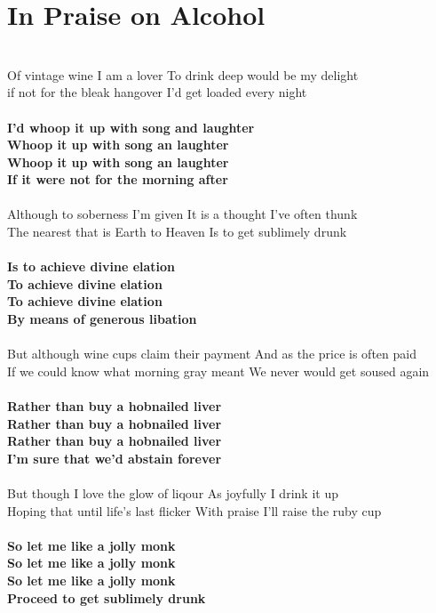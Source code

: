 \documentclass[letterpaper,9pt]{article}
\begin{document}
\section{In Praise on Alcohol}
\Large
\noindent
\\Of vintage wine I am a lover To drink deep would be my delight
\\if not for the bleak hangover I'd get loaded every night
\\
\\\textbf{I'd whoop it up with song and laughter
\\Whoop it up with song an laughter
\\Whoop it up with song an laughter
\\If it were not for the morning after}
\\
\\Although to soberness I'm given It is a thought I've often thunk
\\The nearest that is Earth to Heaven Is to get sublimely drunk
\\
\\\textbf{Is to achieve divine elation
\\To achieve divine elation
\\To achieve divine elation
\\By means of generous libation}
\\
\\But although wine cups claim their payment And as the price is often paid
\\If we could know what morning gray meant We never would get soused again
\\
\\\textbf{Rather than buy a hobnailed liver
\\Rather than buy a hobnailed liver
\\Rather than buy a hobnailed liver
\\I'm sure that we'd abstain forever}
\\
\\But though I love the glow of liqour As joyfully I drink it up
\\Hoping that until life's last flicker With praise I'll raise the ruby cup
\\
\\\textbf{So let me like a jolly monk
\\So let me like a jolly monk
\\So let me like a jolly monk
\\Proceed to get sublimely drunk}
\end{document}

